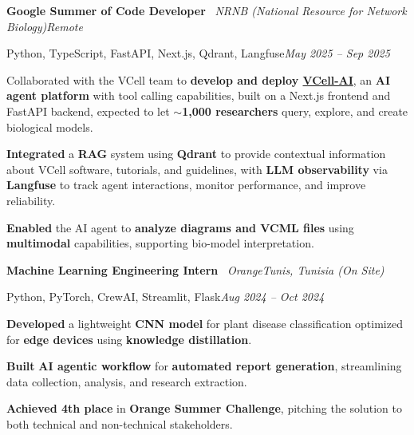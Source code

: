 \begin{onecolentry}
    \textbf{Google Summer of Code Developer} \textbar\ \textit{NRNB (National Resource for Network Biology)}\hfill\textit{Remote}

    {\footnotesize Python, TypeScript, FastAPI, Next.js, Qdrant, Langfuse}\hfill\textit{May 2025 – Sep 2025}%
\end{onecolentry}
\vspace{0.03 cm}
\begin{onecolentry}
    \begin{highlights}
        \item Collaborated with the VCell team to \textbf{develop and deploy \href{https://github.com/virtualcell/VCell-AI}{VCell-AI}}, an \textbf{AI agent platform} with tool calling capabilities, built on a Next.js frontend and FastAPI backend, expected to let \textbf{$\sim$1,000 researchers} query, explore, and create biological models.
        \item \textbf{Integrated} a \textbf{RAG} system using \textbf{Qdrant} to provide contextual information about VCell software, tutorials, and guidelines, with \textbf{LLM observability} via \textbf{Langfuse} to track agent interactions, monitor performance, and improve reliability.
        \item \textbf{Enabled} the AI agent to \textbf{analyze diagrams and VCML files} using \textbf{multimodal} capabilities, supporting bio-model interpretation.
    \end{highlights}
\end{onecolentry}
\entrygap

\begin{onecolentry}
    \textbf{Machine Learning Engineering Intern} \textbar\ \textit{Orange}\hfill\textit{Tunis, Tunisia (On Site)}

    {\footnotesize Python, PyTorch, CrewAI, Streamlit, Flask}\hfill\textit{Aug 2024 – Oct 2024}%
\end{onecolentry}
\vspace{0.03 cm}
\begin{onecolentry}
    \begin{highlights}
        \item \textbf{Developed} a lightweight \textbf{CNN model} for plant disease classification optimized for \textbf{edge devices} using \textbf{knowledge distillation}.
        \item \textbf{Built} \textbf{AI agentic workflow} for \textbf{automated report generation}, streamlining data collection, analysis, and research extraction.
        \item \textbf{Achieved 4th place} in \textbf{Orange Summer Challenge}, pitching the solution to both technical and non-technical stakeholders.
    \end{highlights}
\end{onecolentry}
\vspace{0.1 cm}
